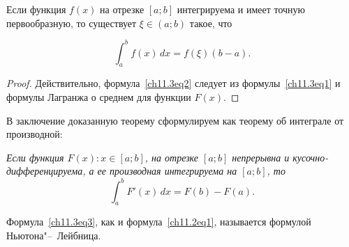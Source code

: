 \begin{cons}
Если функция $f(x)$ на отрезке $[a;b]$ интегрируема и имеет точную первообразную, то существует $\xi \in (a;b)$ такое, что

\begin{equation} \label{ch11.3eq2}
\int_{a}^{b}f(x) \,dx = f(\xi) (b - a).
\end{equation}

\end{cons}
\begin{proof}
Действительно, формула~\eqref{ch11.3eq2} следует из формулы~\eqref{ch11.3eq1} и формулы Лагранжа о среднем для функции $F(x)$.
\end{proof}

В заключение доказанную теорему сформулируем как теорему об интеграле от производной:

\textit{Если функция $F(x)\colon x \in [a;b]$, на отрезке $[a;b]$ непрерывна и кусочно-дифференцируема, а ее производная интегрируема на $[a;b]$, то}
\begin{equation} \label{ch11.3eq3}
\int_{a}^{b}F'(x) \,dx = F(b) - F(a).
\end{equation} 

Формула~\eqref{ch11.3eq3}, как и формула~\eqref{ch11.2eq1}, называется формулой Ньютона"--~Лейбница.